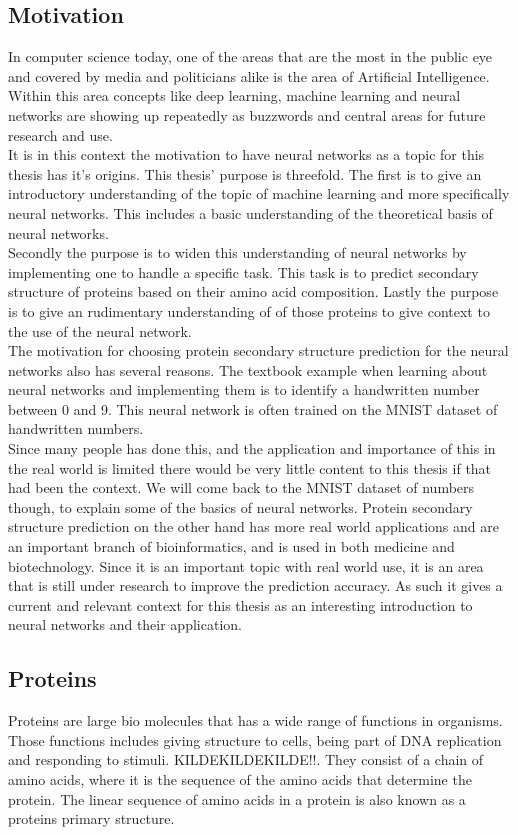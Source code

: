 \subsection{Motivation}
In computer science today, one of the areas that are the most in the public eye and covered by media and politicians alike is the area of Artificial Intelligence. Within this area concepts like deep learning, machine learning and neural networks are showing up repeatedly as buzzwords and central areas for future research and use.\\
It is in this context the motivation to have neural networks as a topic for this thesis has it's origins. This thesis' purpose is threefold. The first is to give an introductory understanding of the topic of machine learning and more specifically neural networks. This includes a basic understanding of the theoretical basis of neural networks. \\
Secondly the purpose is to widen this understanding of neural networks by implementing one to handle a specific task. This task is to predict secondary structure of proteins based on their amino acid composition. Lastly the purpose is to give an rudimentary understanding of of those proteins to give context to the use of the neural network.\\
The motivation for choosing protein secondary structure prediction for the neural networks also has several reasons. 
The textbook example when learning about neural networks and implementing them is to identify a handwritten number between 0 and 9. This neural network is often trained on the MNIST dataset of handwritten numbers. \\
Since many people has done this, and the application and importance of this in the real world is limited there would be very little content to this thesis if that had been the context. We will come back to the MNIST dataset of numbers though, to explain some of the basics of neural networks. Protein secondary structure prediction on the other hand has more real world applications and are an important branch of bioinformatics, and is used in both medicine and biotechnology. Since it is an important topic with real world use, it is an area that is still under research to improve the prediction accuracy. As such it gives a current and relevant context for this thesis as an interesting introduction to neural networks and their application.   


\subsection{Proteins}
Proteins are large bio molecules that has a wide range of functions in organisms. Those functions includes giving structure to cells, being part of DNA replication and responding to stimuli. KILDEKILDEKILDE!!. They consist of a chain of amino acids, where it is the sequence of the amino acids that determine the protein. The linear sequence of amino acids in a protein is also known as a proteins primary structure. 

